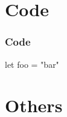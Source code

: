 \documentclass[aspectratio=169]{beamer}
\begin{document}
\section{Code}

\begin{frame}

  \frametitle{Code}
  \begin{semiverbatim}
let foo = "bar"
  \end{semiverbatim}
\end{frame}

\section{Others}
\end{document}
